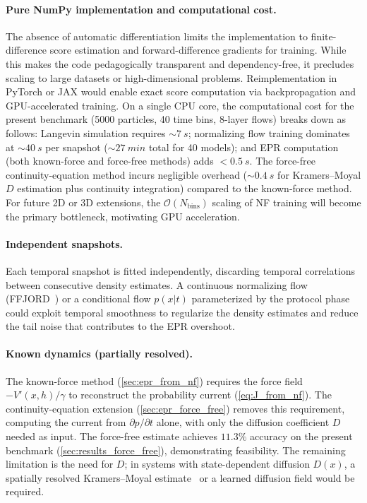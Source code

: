 \paragraph{Pure NumPy implementation and computational cost.}
The absence of automatic differentiation limits the implementation to finite-difference score estimation and forward-difference gradients for training.
While this makes the code pedagogically transparent and dependency-free, it precludes scaling to large datasets or high-dimensional problems.
Reimplementation in PyTorch or JAX would enable exact score computation via backpropagation and GPU-accelerated training.
On a single CPU core, the computational cost for the present benchmark (\num{5000} particles, \num{40} time bins, \num{8}-layer flows) breaks down as follows: Langevin simulation requires ${\sim}\SI{7}{s}$; normalizing flow training dominates at ${\sim}\SI{40}{s}$ per snapshot (${\sim}\SI{27}{min}$ total for \num{40} models); and EPR computation (both known-force and force-free methods) adds $<\SI{0.5}{s}$.
The force-free continuity-equation method incurs negligible overhead (${\sim}\SI{0.4}{s}$ for Kramers--Moyal $D$ estimation plus continuity integration) compared to the known-force method.
For future \num{2}D or \num{3}D extensions, the $\mathcal{O}(N_{\mathrm{bins}})$ scaling of NF training will become the primary bottleneck, motivating GPU acceleration.

\paragraph{Independent snapshots.}
Each temporal snapshot is fitted independently, discarding temporal correlations between consecutive density estimates.
A continuous normalizing flow (FFJORD~\cite{Grathwohl2019}) or a conditional flow $p(x|t)$ parameterized by the protocol phase could exploit temporal smoothness to regularize the density estimates and reduce the tail noise that contributes to the EPR overshoot.

\paragraph{Known dynamics (partially resolved).}
The known-force method (\cref{sec:epr_from_nf}) requires the force field $-V'(x,h)/\gamma$ to reconstruct the probability current (\cref{eq:J_from_nf}).
The continuity-equation extension (\cref{sec:epr_force_free}) removes this requirement, computing the current from $\partial p/\partial t$ alone, with only the diffusion coefficient $D$ needed as input.
The force-free estimate achieves $\num{11.3}\%$ accuracy on the present benchmark (\cref{sec:results_force_free}), demonstrating feasibility.
The remaining limitation is the need for $D$; in systems with state-dependent diffusion $D(x)$, a spatially resolved Kramers--Moyal estimate~\cite{Gorjao2021,Lyu2024} or a learned diffusion field would be required.


